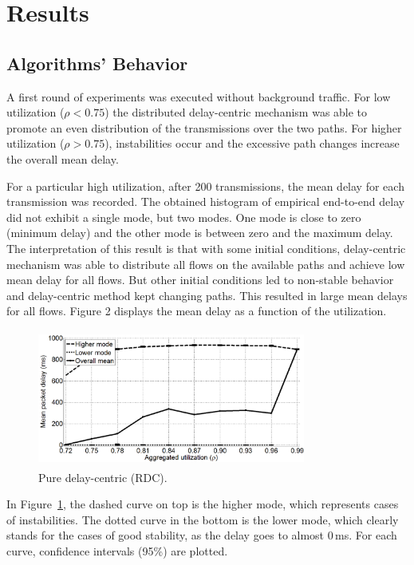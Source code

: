 \documentclass[letterpaper,10pt,oneside,conference,final]{sbrt2015}
\begin{document}
\section{Results}
\subsection{Algorithms' Behavior}
  A first round of experiments was executed without background traffic. For low utilization ($\rho < 0.75$) the distributed delay-centric mechanism was able to promote an even distribution of the transmissions over the two paths. For higher utilization ($\rho > 0.75$), instabilities occur and the excessive path changes increase the overall mean delay. 

For a particular high utilization, after 200 transmissions, the mean delay for each transmission was recorded. The obtained histogram of empirical end-to-end delay did not exhibit a single mode, but two modes. One mode is close to zero (minimum delay) and the other mode is between zero and the maximum delay. The interpretation of this result is that with some initial conditions, delay-centric mechanism was able to distribute all flows on the available paths and achieve low mean delay for all flows. But other initial conditions led to non-stable behavior and delay-centric method kept changing paths. This resulted in large mean delays for all flows. Figure 2 displays the mean delay as a function of the utilization.

\begin{figure}[h!]
\centering
\includegraphics[width=8.8cm,height=4.5cm]{figura2}
\caption{Pure delay-centric (RDC).}
\label{figura2}
\end{figure}

In Figure~\ref{figura2}, the dashed curve on top is the higher mode, which represents cases of instabilities. The dotted curve in the bottom is the lower mode, which clearly stands for the cases of good stability, as the delay goes to almost 0\,ms. For each curve, confidence intervals (95\%) are plotted. 
\end{document}
